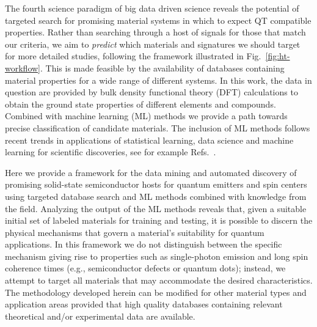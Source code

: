 \documentclass[superscriptaddress,unsortedaddress,
 amsmath,amssymb,
 aps,
]{revtex4-2}
\begin{document}
The fourth science paradigm of big data driven science reveals the potential of targeted search for promising material systems in which to expect QT compatible properties. 
Rather than searching through a host of signals for those that match our criteria, we aim to \textit{predict} which materials and signatures we should target for more detailed studies, following the framework illustrated in Fig.~\ref{fig:ht-workflow}. 
This is made feasible by the availability of databases containing material properties for a wide range of different systems. In this work, the data in question are provided by bulk density functional theory (DFT) calculations to obtain the ground state properties of different elements and compounds. Combined with machine learning (ML) methods we provide a path towards precise classification of candidate materials. The inclusion of ML methods follows recent trends in applications of statistical learning, data science and machine learning for scientific discoveries, see for example Refs.~\cite{deiana2021,Carleo2019}. 

Here we provide a framework for the data mining and automated discovery of promising solid-state semiconductor hosts for quantum emitters and spin centers using targeted database search and ML methods combined with knowledge from the field. 
Analyzing the output of the ML methods reveals that, given a suitable initial set of labeled materials for training and testing, it is possible to discern the physical mechanisms that govern a material's suitability for quantum applications.  
In this framework we do not distinguish between the specific mechanism giving rise to properties such as single-photon emission and long spin coherence times (e.g., semiconductor defects or quantum dots); instead, we attempt to target all materials that may accommodate the desired characteristics.  
The methodology developed herein can be modified for other material types and application areas provided that high quality databases containing relevant theoretical and/or experimental data are available. 
\end{document}
